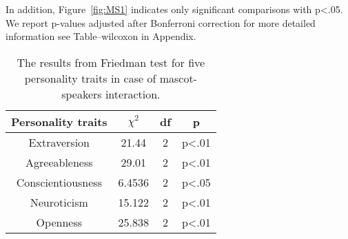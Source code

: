 In addition, Figure~\ref{fig:MS1} indicates only significant comparisons with p<.05.
We report p-values adjusted after Bonferroni correction for more
detailed information see Table--wilcoxon in Appendix.

\begin{table}[!htb]
    \renewcommand{\arraystretch}{1}
    \begin{center}
        \begin{tabular}{|c|c|c|c|}
            \hline
            \textbf{Personality traits} & \textbf{$\chi^2$} & \textbf{df} & \textbf{p} \\
            \hline
            Extraversion &21.44 &2 &p<.01 \\
            \hline
            Agreeableness &29.01 &2 &p<.01\\
            \hline
            Conscientiousness &6.4536 &2 &p<.05\\
            \hline
            Neuroticism &15.122 &2 &p<.01 \\
            \hline
            Openness &25.838 &2 &p<.01 \\
            \hline
        \end{tabular}
        \caption{The results from Friedman test for five personality traits in case of mascot-speakers interaction.}
        \label{table:friedmanMS1}
    \end{center}
\end{table}

